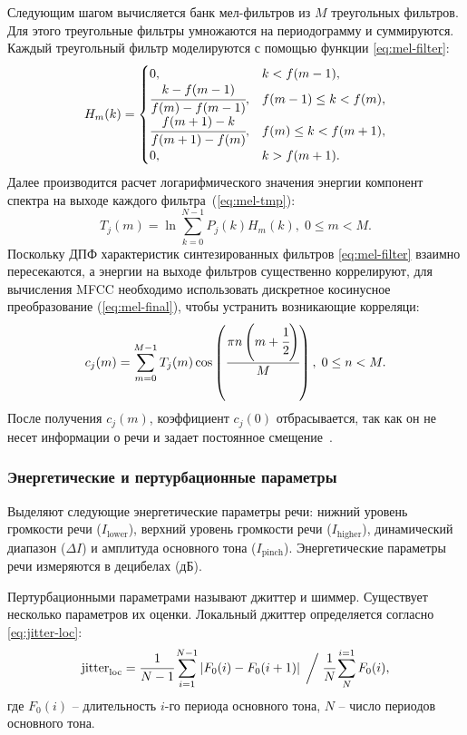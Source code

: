 Следующим шагом вычисляется банк мел-фильтров из $M$ треугольных фильтров. Для этого треугольные фильтры умножаются на периодограмму и суммируются. Каждый треугольный фильтр моделируются с помощью функции \ref{eq:mel-filter}:
\begin{equation}\label{eq:mel-filter}
	H_m(k) = \begin{cases}
		0, & k < f(m - 1), \\
		\cfrac{k - f(m - 1)}{f(m) - f(m - 1)}, & f(m - 1) \leq k < f(m),\\
		\cfrac{f(m + 1) - k}{f(m + 1) - f(m)}, & f(m) \leq k < f(m + 1),\\
		0, & k > f(m + 1).\\
	\end{cases}
\end{equation}
Далее производится расчет логарифмического значения энергии компонент спектра на выходе каждого фильтра~(\ref{eq:mel-tmp}):
\begin{equation}\label{eq:mel-tmp}
	T_j(m) = \ln \sum_{k = 0}^{N - 1}P_j(k)H_m(k),\;0 \leq m < M.
\end{equation}
Поскольку ДПФ характеристик синтезированных фильтров \ref{eq:mel-filter} взаимно пересекаются, а энергии на выходе фильтров существенно коррелируют, для вычисления MFCC необходимо использовать дискретное косинусное преобразование (\ref{eq:mel-final}), чтобы устранить возникающие корреляци:
\begin{equation}\label{eq:mel-final}
	c_j(m) = \sum_{m=0}^{M-1}T_j(m)\cos\left(\cfrac{\pi n\left(m + \cfrac{1}{2}\right)}{M}\right),\;0 \leq n < M.
\end{equation}
После получения $c_j(m)$, коэффициент $c_j(0)$ отбрасывается, так как он не несет информации о речи и задает постоянное смещение~\cite{frames}.

\subsubsection{Энергетические и пертурбационные параметры}

Выделяют следующие энергетические параметры речи: нижний уровень громкости речи ($I_{\mathrm{lower}}$), верхний уровень громкости речи ($I_{\mathrm{higher}}$), динамический диапазон ($\Delta I$) и амплитуда основного тона ($I_{\mathrm{pinch}}$). Энергетические параметры речи измеряются в децибелах (дБ).

Пертурбационными параметрами называют джиттер и шиммер. Существует несколько параметров их оценки. Локальный джиттер определяется согласно \ref{eq:jitter-loc}:
\begin{equation}\label{eq:jitter-loc}
	\mathrm{jitter}_{\mathrm{loc}} = \cfrac{1}{N - 1}\sum_{i = 1}^{N - 1}\left|F_0(i) - F_0(i + 1)\right|\;\bigg/\;
		\cfrac{1}{N}\sum_{N}^{i = 1}F_0(i),
\end{equation}
где $F_0(i)$ -- длительность $i$-го периода основного тона, $N$ -- число периодов основного тона.

